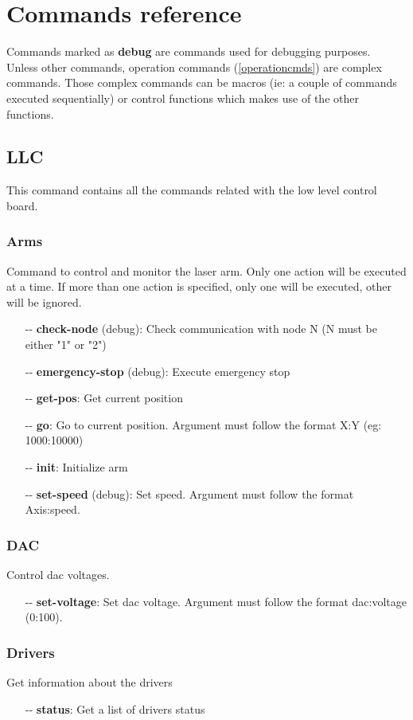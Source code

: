\documentclass[letterpaper, 10 pt]{article}
\begin{document}
\section{Commands reference}
Commands marked as \textbf{debug} are commands used for debugging purposes.\\
\linebreak
Unless other commands, operation commands (\ref{operationcmds}) are complex commands. Those complex commands can be macros (ie: a couple of commands executed sequentially) or control functions which makes use of the other functions.
\subsection{LLC}
This command contains all the commands related with the low level control board.
\subsubsection{Arms}
Command to control and monitor the laser arm. Only one action will be executed at a time. If more than one action is specified, only one will be executed, other will be ignored.
\begin{itemize}
	\item[-{}-] \textbf{check-node} (debug): Check communication with node N (N must be either "1" or "2")
	\item[-{}-] \textbf{emergency-stop} (debug): Execute emergency stop
	\item[-{}-] \textbf{get-pos}: Get current position
	\item[-{}-] \textbf{go}: Go to current position. Argument must follow the format X:Y (eg: 1000:10000)
	\item[-{}-] \textbf{init}: Initialize arm
	\item[-{}-] \textbf{set-speed} (debug): Set speed. Argument must follow the format Axis:speed.
\end{itemize}
\subsubsection{DAC}
Control dac voltages.
\begin{itemize}
	\item[-{}-] \textbf{set-voltage}: Set dac voltage. Argument must follow the format dac:voltage (0:100).
\end{itemize}

\subsubsection{Drivers}
Get information about the drivers
\begin{itemize}
	\item[-{}-] \textbf{status}: Get a list of drivers status
\end{itemize}
\end{document}
